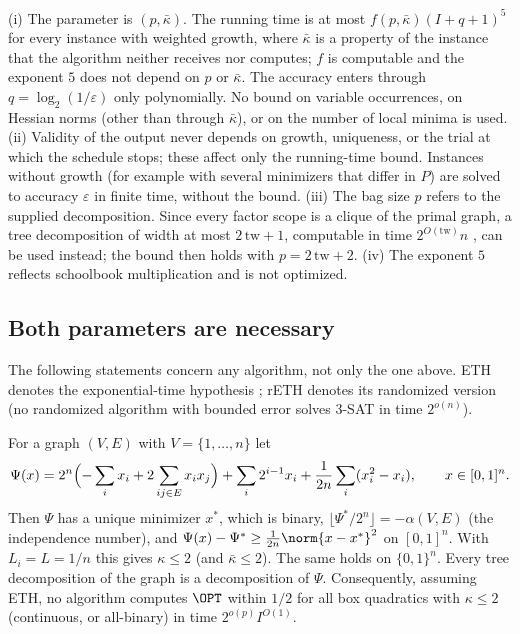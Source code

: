 \begin{remark}
\label{core:rem:fpt}
(i) The parameter is $(p,\bar\kappa)$. The running time is at most
$f(p,\bar\kappa)(I+q+1)^5$ for every instance with weighted growth, where
$\bar\kappa$ is a property of the instance that the algorithm neither
receives nor computes; $f$ is computable and the exponent $5$ does not depend
on $p$ or $\bar\kappa$. The accuracy enters through $q=\log_2(1/\varepsilon)$
only polynomially. No bound on variable occurrences, on Hessian norms (other
than through $\bar\kappa$), or on the number of local minima is used.
(ii) Validity of the output never depends on growth, uniqueness, or the trial
at which the schedule stops; these affect only the running-time bound.
Instances without growth (for example with several minimizers that differ in
$P$) are solved to accuracy $\varepsilon$ in finite time, without the bound.
(iii) The bag size $p$ refers to the supplied decomposition. Since every
factor scope is a clique of the primal graph, a tree decomposition of width
at most $2\,\mathrm{tw}+1$, computable in time $2^{O(\mathrm{tw})}n$
\cite{Korhonen2021}, can be used instead; the bound then holds with
$p=2\,\mathrm{tw}+2$.
(iv) The exponent $5$ reflects schoolbook multiplication and is not
optimized.
\end{remark}

\subsection{Both parameters are necessary}\label{core:sec:lower}

The following statements concern any algorithm, not only the one above. ETH
denotes the exponential-time hypothesis \cite{ImpagliazzoPaturiZane2001};
rETH denotes its randomized version (no randomized algorithm with bounded
error solves 3-SAT in time $2^{o(n)}$).

\begin{proposition}
\label{core:prop:lbwidth}
For a graph $(V,E)$ with $V=\{1,\dots,n\}$ let
\[
\Psi(x)=2^n\Bigl(-\sum_ix_i+2\sum_{ij\in E}x_ix_j\Bigr)+\sum_i2^{i-1}x_i
+\frac1{2n}\sum_i(x_i^2-x_i),\qquad x\in[0,1]^n .
\]
Then $\Psi$ has a unique minimizer $x^*$, which is binary,
$\lfloor\Psi^*/2^n\rfloor=-\alpha(V,E)$ (the independence number), and
$\Psi(x)-\Psi^*\ge\frac1{2n}\norm{x-x^*}^2$ on $[0,1]^n$. With
$L_i=L=1/n$ this gives $\kappa\le2$ (and $\bar\kappa\le2$). The same holds on
$\{0,1\}^n$. Every tree decomposition of the graph is a decomposition of
$\Psi$. Consequently, assuming ETH, no algorithm computes $\OPT$ within $1/2$
for all box quadratics with $\kappa\le2$ (continuous, or all-binary) in time
$2^{o(p)}I^{O(1)}$.
\end{proposition}

